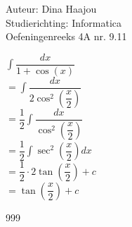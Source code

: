 \documentclass[a4paper]{article}
\begin{document}
\normalsize

\noindent \large Auteur: Dina Haajou \\
\noindent \large Studierichting: Informatica \\
\noindent \large Oefeningenreeks 4A nr. 9.11 \\

\medskip

\normalsize

$\displaystyle \int \dfrac{dx}{1 + \cos(x)}$ \\

$= \displaystyle \int \dfrac{dx}{2\cos^2\left(\dfrac{x}{2}\right)}$ \\

$= \dfrac{1}{2} \displaystyle \int \dfrac{dx}{\cos^2\left(\dfrac{x}{2}\right)}$ \\

$= \dfrac{1}{2} \displaystyle \int \sec^2\left(\dfrac{x}{2}\right) dx$ \\

$= \dfrac{1}{2} \cdot 2 \tan\left(\dfrac{x}{2}\right) + c$ \\

$= \tan\left(\dfrac{x}{2}\right) + c$ \\

\begin{thebibliography}{999}
\end{thebibliography}
\end{document}
